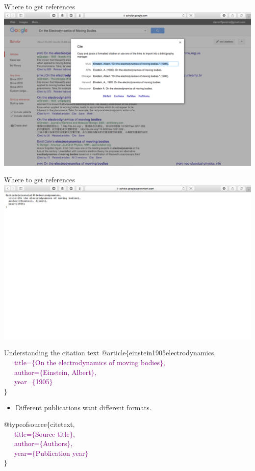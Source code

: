 \documentclass[usenames,dvipsnames,aspectratio=169]{beamer}
\newcommand{\aitem}{\item[$\cdot$]}
\begin{document}
\begin{frame}[t]{Where to get references}
\includegraphics[trim={0 10cm 0 0}, clip=true, width=\linewidth]{biblio3.png}
\end{frame}

\begin{frame}[t]{Where to get references}
\includegraphics[trim={0 10cm 0 0}, clip=true, width=\linewidth]{biblio4.png}
\end{frame}


\begin{frame}[t]{Understanding the citation text}
\textcolor{YellowOrange}{@article$\{$}einstein1905electrodynamics,\\
\textcolor{purple}{~~~title=$\{$On the electrodynamics of moving bodies$\}$,\\
~~~author=$\{$Einstein, Albert$\}$,\\
~~~year=$\{$1905$\}$\\}
\textcolor{YellowOrange}{$\}$}
\begin{itemize}
\aitem Different publications want different formats.
\end{itemize}
\textcolor{YellowOrange}{@typeofsource$\{$}citetext,\\
\textcolor{purple}{~~~title=$\{$Source title$\}$,\\
~~~author=$\{$Authors$\}$,\\
~~~year=$\{$Publication year$\}$\\}
\textcolor{YellowOrange}{$\}$}
\end{frame}
\end{document}
